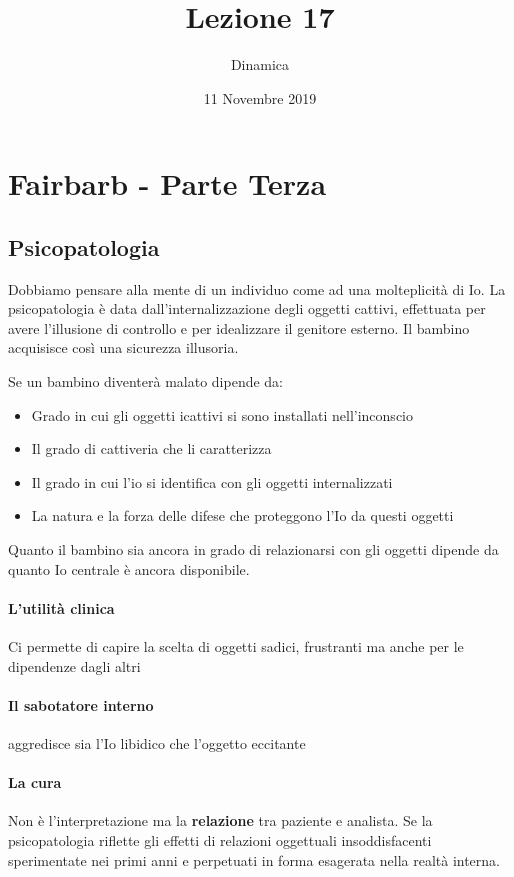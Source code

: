 \documentclass[12pt, a4paper]{article}
\date{11 Novembre 2019}
\title{Lezione 17}
\author{Dinamica}
\begin{document}
\maketitle

\section{Fairbarb - Parte Terza}

\subsection{Psicopatologia}

Dobbiamo pensare alla mente di un individuo come ad una molteplicità di Io. La psicopatologia è data dall'internalizzazione degli oggetti cattivi, effettuata per avere l'illusione di controllo e per idealizzare il genitore esterno.
Il bambino acquisisce cos\`i una sicurezza illusoria.

Se un bambino diventerà malato dipende da:

\begin{itemize}
    \item Grado in cui gli oggetti icattivi si sono installati nell'inconscio
    \item Il grado di cattiveria che li caratterizza
    \item Il grado in cui l'io si identifica con gli oggetti internalizzati
    \item La natura e la forza delle difese che proteggono l'Io da questi oggetti
\end{itemize}

Quanto il bambino sia ancora in grado di relazionarsi con gli oggetti dipende da quanto Io centrale è ancora disponibile.

\paragraph{L'utilità clinica}  Ci permette di capire la scelta di oggetti sadici, frustranti ma anche per le dipendenze dagli altri

\paragraph{Il sabotatore interno}  aggredisce sia l'Io libidico che l'oggetto eccitante

\paragraph{La cura}  Non è l'interpretazione ma la \textbf{relazione} tra paziente e analista.
Se la psicopatologia riflette gli effetti di relazioni oggettuali insoddisfacenti sperimentate nei primi anni e perpetuati in forma esagerata nella realtà interna.
\end{document}
